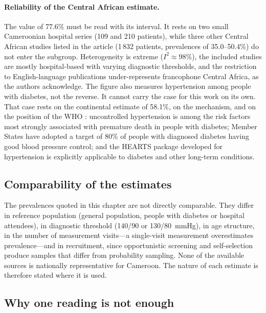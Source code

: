 \paragraph{Reliability of the Central African estimate.}\label{sec:central-estimates} The value of 77.6\% must be read with its interval. It rests on two small Cameroonian hospital series (109 and 210 patients), while three other Central African studies listed in the article (1\,832 patients, prevalences of 35.0--50.4\%) do not enter the subgroup. Heterogeneity is extreme ($I^2 \approx 98\%$), the included studies are mostly hospital-based with varying diagnostic thresholds, and the restriction to English-language publications under-represents francophone Central Africa, as the authors acknowledge. The figure also measures hypertension among people with diabetes, not the reverse. It cannot carry the case for this work on its own. That case rests on the continental estimate of 58.1\%, on the mechanism, and on the position of the WHO \parencite{who2023hypertension}: uncontrolled hypertension is among the risk factors most strongly associated with premature death in people with diabetes; Member States have adopted a target of 80\% of people with diagnosed diabetes having good blood pressure control; and the HEARTS package developed for hypertension is explicitly applicable to diabetes and other long-term conditions.

\subsection{Comparability of the estimates}\label{sec:comparability}

The prevalences quoted in this chapter are not directly comparable. They differ in reference population (general population, people with diabetes or hospital attendees), in diagnostic threshold (140/90 or 130/80~mmHg), in age structure, in the number of measurement visits---a single-visit measurement overestimates prevalence---and in recruitment, since opportunistic screening and self-selection produce samples that differ from probability sampling. None of the available sources is nationally representative for Cameroon. The nature of each estimate is therefore stated where it is used.

\subsection{Why one reading is not enough}\label{sec:variability}\label{sec:dx-requires}\label{sec:followup-requires}

